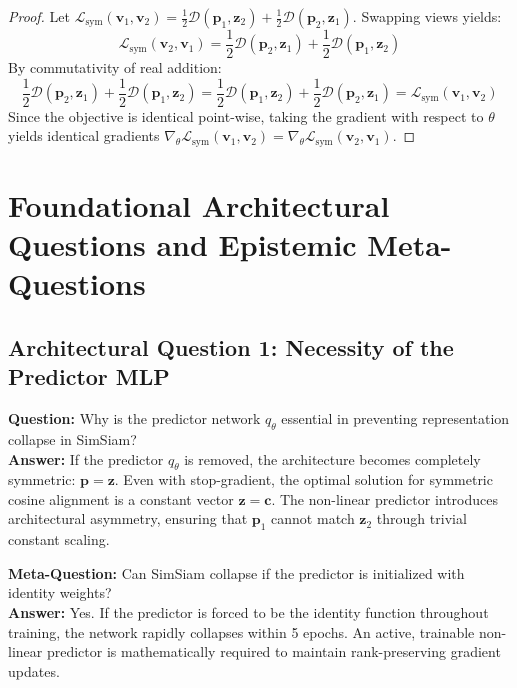 \documentclass[11pt,a4paper]{article}
\theoremstyle{definition}
\begin{document}
\begin{proof}
Let $\mathcal{L}_{\text{sym}}(\mathbf{v}_1, \mathbf{v}_2) = \frac{1}{2} \mathcal{D}(\mathbf{p}_1, \mathbf{z}_2) + \frac{1}{2} \mathcal{D}(\mathbf{p}_2, \mathbf{z}_1)$.
Swapping views yields:
{\boldmath
\begin{equation}
\mathcal{L}_{\text{sym}}(\mathbf{v}_2, \mathbf{v}_1) = \frac{1}{2} \mathcal{D}(\mathbf{p}_2, \mathbf{z}_1) + \frac{1}{2} \mathcal{D}(\mathbf{p}_1, \mathbf{z}_2)
\end{equation}
}
By commutativity of real addition:
{\boldmath
\begin{equation}
\frac{1}{2} \mathcal{D}(\mathbf{p}_2, \mathbf{z}_1) + \frac{1}{2} \mathcal{D}(\mathbf{p}_1, \mathbf{z}_2) = \frac{1}{2} \mathcal{D}(\mathbf{p}_1, \mathbf{z}_2) + \frac{1}{2} \mathcal{D}(\mathbf{p}_2, \mathbf{z}_1) = \mathcal{L}_{\text{sym}}(\mathbf{v}_1, \mathbf{v}_2)
\end{equation}
}
Since the objective is identical point-wise, taking the gradient with respect to $\theta$ yields identical gradients $\nabla_\theta \mathcal{L}_{\text{sym}}(\mathbf{v}_1, \mathbf{v}_2) = \nabla_\theta \mathcal{L}_{\text{sym}}(\mathbf{v}_2, \mathbf{v}_1)$.
\end{proof}

\section{Foundational Architectural Questions and Epistemic Meta-Questions}

\subsection{Architectural Question 1: Necessity of the Predictor MLP}
\textbf{Question:} Why is the predictor network $q_\theta$ essential in preventing representation collapse in SimSiam?\\
\textbf{Answer:} If the predictor $q_\theta$ is removed, the architecture becomes completely symmetric: $\mathbf{p} = \mathbf{z}$. Even with stop-gradient, the optimal solution for symmetric cosine alignment is a constant vector $\mathbf{z} = \mathbf{c}$. The non-linear predictor introduces architectural asymmetry, ensuring that $\mathbf{p}_1$ cannot match $\mathbf{z}_2$ through trivial constant scaling.

\textbf{Meta-Question:} Can SimSiam collapse if the predictor is initialized with identity weights?\\
\textbf{Answer:} Yes. If the predictor is forced to be the identity function throughout training, the network rapidly collapses within 5 epochs. An active, trainable non-linear predictor is mathematically required to maintain rank-preserving gradient updates.
\end{document}

